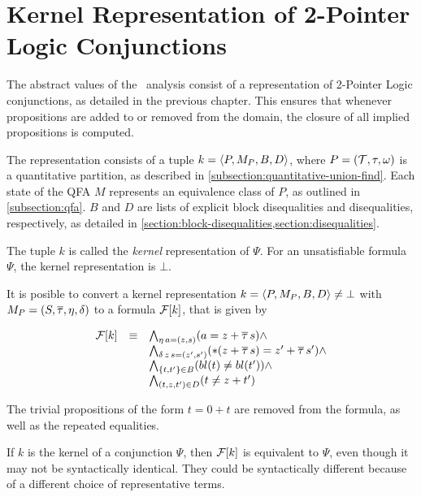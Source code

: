 



\section{Kernel Representation of 2-Pointer Logic Conjunctions}
The abstract values of the \cpo\ analysis consist of a representation
of 2-Pointer Logic conjunctions, as detailed in the previous chapter.
This ensures that whenever propositions are added to or removed from the domain,
the closure of all implied propositions is computed.

The representation consists of a tuple $k = \langle P,M_P,B,D\rangle$,
where $P = (\mathcal{T}, \tau, \omega)$ is a quantitative partition, as described in \cref{subsection:quantitative-union-find}.
Each state of the QFA $M$ represents an equivalence class of $P$, as outlined in \cref{subsection:qfa}.
$B$ and $D$ are lists of explicit block disequalities and disequalities, respectively, as detailed in \cref{section:block-disequalities,section:disequalities}.

The tuple $k$ is called the \emph{kernel} representation of $\Psi$.
For an unsatisfiable formula $\Psi$, the kernel representation is $\bot$.

It is posible to convert a kernel representation $k = \langle P,M_P,B,D\rangle \neq \bot$ with $M_P = (S, \overline{\tau}, \eta, \delta)$ to a formula $\mathcal{F}[k]$, that is given by

\[
    \begin{array}{lll}
        \mathcal{F}[k] & \equiv & \bigwedge_{\eta\,a=(z,s)} (a = z + \overline{\tau}\,s) \land                        \\
              &        & \bigwedge_{\delta\,z\,s=(z',s')} (*(z + \overline{\tau}\,s) = z' + \overline{\tau}\,s') \land \\
              &        & \bigwedge_{\{t, t'\} \in B} (bl(t) \neq bl(t')) \land                     \\
              &        & \bigwedge_{(t, z, t') \in D} (t \neq z + t')
    \end{array}
\]

The trivial propositions of the form $t = 0 + t$ are removed from the formula, as well as the repeated equalities.

If $k$ is the kernel of a conjunction $\Psi$, then $\mathcal{F}[k]$ is equivalent to $\Psi$,
even though it may not be syntactically identical.
They could be syntactically different because of a different choice of representative terms.



